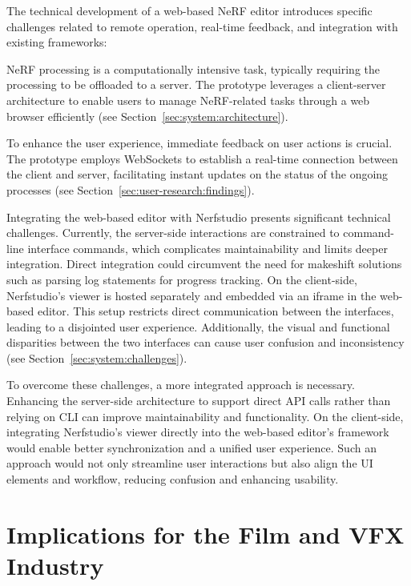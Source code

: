 The technical development of a web-based NeRF editor introduces specific challenges related to remote operation, real-time feedback, and integration with existing frameworks:

 NeRF processing is a computationally intensive task, typically requiring the processing to be offloaded to a server.
The prototype leverages a client-server architecture to enable users to manage NeRF-related tasks through a web browser efficiently (see Section~\ref{sec:system:architecture}).
    
 To enhance the user experience, immediate feedback on user actions is crucial.
The prototype employs WebSockets to establish a real-time connection between the client and server, facilitating instant updates on the status of the ongoing processes (see Section~\ref{sec:user-research:findings}).
    
 Integrating the web-based editor with Nerfstudio presents significant technical challenges.
Currently, the server-side interactions are constrained to command-line interface commands, which complicates maintainability and limits deeper integration.
Direct integration could circumvent the need for makeshift solutions such as parsing log statements for progress tracking.
On the client-side, Nerfstudio's viewer is hosted separately and embedded via an iframe in the web-based editor.
This setup restricts direct communication between the interfaces, leading to a disjointed user experience.
Additionally, the visual and functional disparities between the two interfaces can cause user confusion and inconsistency (see Section~\ref{sec:system:challenges}).

To overcome these challenges, a more integrated approach is necessary.
Enhancing the server-side architecture to support direct API calls rather than relying on CLI can improve maintainability and functionality.
On the client-side, integrating Nerfstudio's viewer directly into the web-based editor's framework would enable better synchronization and a unified user experience.
Such an approach would not only streamline user interactions but also align the UI elements and workflow, reducing confusion and enhancing usability.


\section{Implications for the Film and VFX Industry}
\label{sec:discussion:implications}

